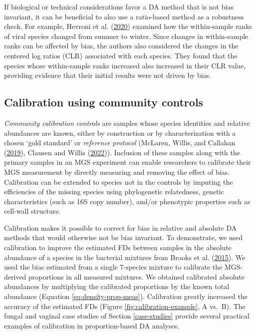 \documentclass[
]{article}
\begin{document}
If biological or technical considerations favor a DA method that is not bias invariant, it can be beneficial to also use a ratio-based method as a robustness check.
For example, Hevroni et al. (\protect\hyperlink{ref-hevroni2020seas}{2020}) examined how the within-sample ranks of viral species changed from summer to winter.
Since changes in within-sample ranks can be affected by bias, the authors also considered the changes in the centered log ratios (CLR) associated with each species.
They found that the species whose within-sample ranks increased also increased in their CLR value, providing evidence that their initial results were not driven by bias.

\hypertarget{calibrate-compositions}{%
\subsection{Calibration using community controls}\label{calibrate-compositions}}

\emph{Community calibration controls} are samples whose species identities and relative abundances are known, either by construction or by characterization with a chosen `gold standard' or \emph{reference protocol} (McLaren, Willis, and Callahan (\protect\hyperlink{ref-mclaren2019cons}{2019}), Clausen and Willis (\protect\hyperlink{ref-clausen2022mode}{2022})).
Inclusion of these samples along with the primary samples in an MGS experiment can enable researchers to calibrate their MGS measurement by directly measuring and removing the effect of bias.
Calibration can be extended to species not in the controls by imputing the efficiencies of the missing species using phylogenetic relatedness, genetic characteristics (such as 16S copy number), and/or phenotypic properties such as cell-wall structure.

Calibration makes it possible to correct for bias in relative and absolute DA methods that would otherwise not be bias invariant.
To demonstrate, we used calibration to improve the estimated FDs between samples in the absolute abundance of a species in the bacterial mixtures from Brooks et al. (\protect\hyperlink{ref-brooks2015thet}{2015}).
We used the bias estimated from a single 7-species mixture to calibrate the MGS-derived proportions in all measured mixtures.
We obtained calibrated absolute abundances by multiplying the calibrated proportions by the known total abundance (Equation \eqref{eq:density-prop-meas}).
Calibration greatly increased the accuracy of the estimated FDs (Figure \ref{fig:calibration-example}, A vs.~B).
The fungal and vaginal case studies of Section \ref{case-studies} provide several practical examples of calibration in proportion-based DA analyses.
\end{document}
